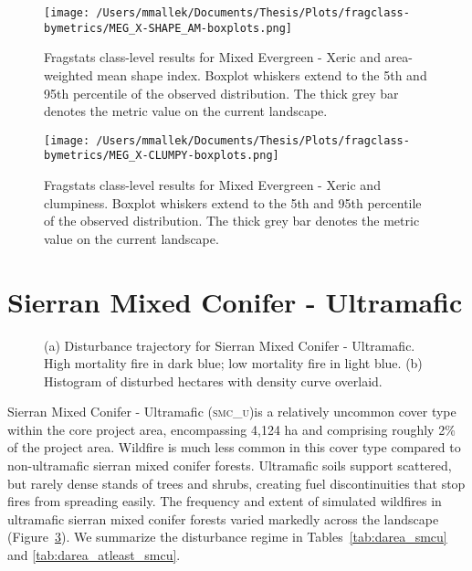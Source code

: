 \begin{figure}[!htbp]
\centering
    \texttt{[image: /Users/mmallek/Documents/Thesis/Plots/fragclass-bymetrics/MEG\_X-SHAPE\_AM-boxplots.png]}
  \caption{Fragstats class-level results for Mixed Evergreen - Xeric and area-weighted mean shape index. Boxplot whiskers extend to the 5th and 95th percentile of the observed distribution. The thick grey bar denotes the metric value on the current landscape.}
  \label{fig:megx_shapeam}
\end{figure}


\begin{figure}[!htbp]
\centering
    \texttt{[image: /Users/mmallek/Documents/Thesis/Plots/fragclass-bymetrics/MEG\_X-CLUMPY-boxplots.png]}
  \caption{Fragstats class-level results for Mixed Evergreen - Xeric and clumpiness. Boxplot whiskers extend to the 5th and 95th percentile of the observed distribution. The thick grey bar denotes the metric value on the current landscape.}
  \label{fig:megx_clumpy}
\end{figure}


\clearpage
\section{Sierran Mixed Conifer - Ultramafic} 
\begin{figure}[!htbp]
  \centering
  \caption{\small (a) Disturbance trajectory for Sierran Mixed Conifer - Ultramafic. High mortality fire in dark blue; low mortality fire in light blue. (b) Histogram of disturbed hectares with density curve overlaid.} 
  \label{fig:darea_smcu}
\end{figure}

Sierran Mixed Conifer - Ultramafic (\textsc{smc\_u})is a relatively uncommon cover type within the core project area, encompassing 4,124 ha and comprising roughly 2\% of the project area. Wildfire is much less common in this cover type compared to non-ultramafic sierran mixed conifer forests. Ultramafic soils support scattered, but rarely dense stands of trees and shrubs, creating fuel discontinuities that stop fires from spreading easily. The frequency and extent of simulated wildfires in ultramafic sierran mixed conifer forests varied markedly across the landscape (Figure~\ref{fig:darea_smcu}).  We summarize the disturbance regime in Tables~\ref{tab:darea_smcu} and \ref{tab:darea_atleast_smcu}.

